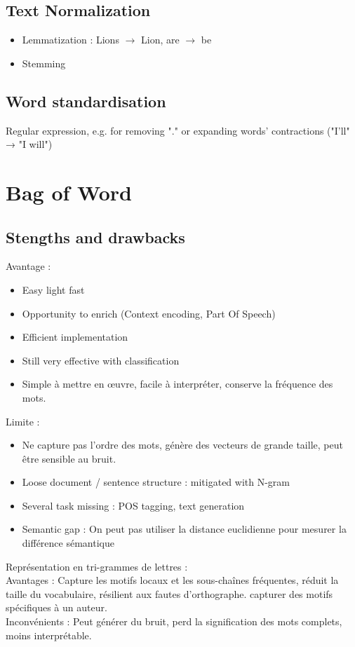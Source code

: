 \documentclass{article}
\begin{document}
\begin{multicols}{2}
    \subsection{Text Normalization}
    \begin{itemize}
        \item Lemmatization : Lions $\rightarrow$ Lion, are $\rightarrow$ be
        \item Stemming
    \end{itemize}
    
    \subsection{Word standardisation}
    Regular expression, e.g. for removing "." or expanding words’ contractions ("I’ll" → "I will")
    
    
    \section{Bag of Word}
    
    \subsection{Stengths and drawbacks}
    Avantage : 
    \begin{itemize}
        \item Easy light fast 
        \item Opportunity to enrich (Context encoding, Part Of Speech)
        \item Efficient implementation
        \item Still very effective with classification
        \item Simple à mettre en œuvre, facile à interpréter, conserve la fréquence des mots.
    \end{itemize}
    Limite : 
    \begin{itemize}
        \item Ne capture pas l'ordre des mots, génère des vecteurs de grande taille, peut être sensible au bruit.
        \item Loose document / sentence structure : mitigated with N-gram
        \item Several task missing : POS tagging, text generation
        \item Semantic gap : On peut pas utiliser la distance euclidienne pour mesurer la différence sémantique
    \end{itemize}
    Représentation en tri-grammes de lettres :\\
    Avantages : Capture les motifs locaux et les sous-chaînes fréquentes, réduit la taille du vocabulaire, résilient aux fautes d'orthographe. capturer des motifs spécifiques à un auteur.\\
    Inconvénients : Peut générer du bruit, perd la signification des mots complets, moins interprétable.
    

\end{multicols}
\end{document}
